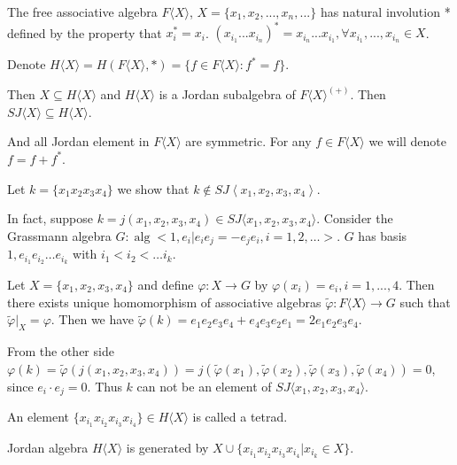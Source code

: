 \documentclass{article}
\def\<{\mathop{\langle}}
\def\>{\mathop{\rangle}}
\begin{document}
The free associative algebra $F\langle X \rangle$, $X = \{x_1, x_2, ..., x_n, ...\}$ has natural involution * defined by the property that $x_i^* = x_i$. $(x_{i_1}...x_{i_n})^* = x_{i_n}...x_{i_1}, \forall x_{i_1}, ..., x_{i_n} \in X$.  

Denote $H\langle X \rangle = H(F\langle X \rangle, *) = \{f \in F\langle X \rangle : f^* = f\}$.  

Then $X \subseteq H\langle X \rangle$ and $H\langle X \rangle$ is a Jordan subalgebra of $F\langle X \rangle^{(+)}$. Then $SJ\langle X \rangle \subseteq H\langle X \rangle$.  

And all Jordan element in $F\langle X \rangle$ are symmetric. For any $f \in F\langle X \rangle$ we will denote ${f} = f + f^*$.  

Let $ k=\{x_1x_2x_3x_4\} $ we show that $ k \notin SJ\<x_1, x_2, x_3, x_4 \> $.

In fact, suppose $k =  j(x_1, x_2, x_3, x_4)  \in SJ\langle x_1, x_2, x_3, x_4 \rangle$. Consider the Grassmann algebra $G: \operatorname{alg} < 1, e_i |e_i e_j = - e_j e_i, i=1,2,\ldots >$. $G$ has basis $1, e_{i_1}e_{i_2}\ldots e_{i_k}$ with $i_1 < i_2< \ldots i_k$. 

Let $X = \{x_1, x_2, x_3, x_4\}$ and define $\varphi: X \to G$ by $\varphi(x_i) = e_i, i=1,...,4$. Then there exists unique homomorphism of associative algebras $\tilde{\varphi}: F\langle X \rangle \to G$ such that $\tilde{\varphi}|_X = \varphi$. Then we have $\tilde{\varphi}(k) = e_1e_2e_3e_4 + e_4e_3e_2e_1 = 2e_1e_2e_3e_4$.  

From the other side $\varphi(k) = \tilde{\varphi}(j( x_1, x_2 , x_3, x_4) ) = j(\tilde{\varphi}(x_1),\tilde{\varphi}(x_2), \tilde{\varphi}(x_3), \tilde{\varphi}(x_4))=0$, since $e_i \cdot e_j = 0$. Thus $ k $ can not be an element of $SJ\langle x_1, x_2, x_3, x_4 \rangle$.

\begin{definition}
An element $\{x_{i_1} x_{i_2} x_{i_3} x_{i_4}\} \in H\langle X \rangle$ is called a tetrad.  
\end{definition}

\begin{theorem}[Cohn]
    Jordan algebra $H\langle X \rangle$ is generated by $X \cup \{x_{i_1} x_{i_2} x_{i_3} x_{i_4}| x_{i_k} \in X\}$.  
\end{theorem}
\end{document}

